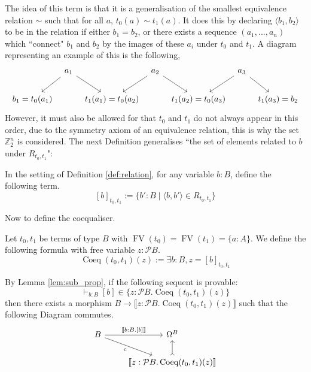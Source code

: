 \documentclass{tac}
\newcommand{\bb}[1]{\mathbb{#1}}
\newcommand{\call}[1]{\mathcal{#1}}
\newcommand{\lto}{\longrightarrow}
\begin{document}
	The idea of this term is that it is a generalisation of the smallest equivalence relation $\sim$ such that for all $a$, $t_0(a) \sim t_1(a)$. It does this by declaring $\langle b_1,b_2\rangle$ to be in the relation if either $b_1 = b_2$, or there exists a sequence $(a_1,...,a_{n})$ which ``connect" $b_1$ and $b_2$ by the images of these $a_i$ under $t_0$ and $t_1$. A diagram representing an example of this is the following,
	\[
	\begin{tikzcd}[column sep = tiny]
		& a_1\arrow[dl]\arrow[dr] & & a_2\arrow[dl]\arrow[dr] & & a_3\arrow[dl]\arrow[dr]\\
		b_1 = t_0(a_1) & & t_1(a_1) = t_0(a_2) & & t_1(a_2) = t_0(a_3) & & t_1(a_3) = b_2
	\end{tikzcd}
	\]
	However, it must also be allowed for that $t_0$ and $t_1$ do not always appear in this order, due to the symmetry axiom of an equivalence relation, this is why the set $\bb{Z}_2^n$ is considered. The next Definition generalises ``the set of elements related to $b$ under $R_{t_0,t_1}$":
	\begin{definition}
		In the setting of Definition \ref{def:relation}, for any variable $b:B$, define the following term.
		\[[b]_{t_0,t_1} := \lbrace b' : B \mid \langle b, b'\rangle \in R_{t_0,t_1} \rbrace\]
	\end{definition}
	Now to define the coequaliser.
	\begin{definition}
		Let $t_0,t_1$ be terms of type $B$ with $\operatorname{FV}(t_0) = \operatorname{FV}(t_1) = \lbrace a: A \rbrace$. We define the following formula with free variable $z : \call{P}B$.
		\begin{equation}\label{eq:coeq_def}
			\operatorname{Coeq}(t_0,t_1)(z) := \exists b: B, z = [b]_{t_0,t_1}
		\end{equation}
	\end{definition}
	By Lemma \ref{lem:sub_prop}, if the following sequent is provable:
	\begin{equation}\label{eq:coeq_sequent}
		\vdash_{b:B}[b] \in \lbrace z: \call{P}B . \operatorname{Coeq}(t_0,t_1)(z)\rbrace
	\end{equation}
	then there exists a morphism $B \lto \llbracket z:\call{P}B . \operatorname{Coeq}(t_0,t_1)(z)\rrbracket$ such that the following Diagram commutes.
	\begin{equation}\label{eq:coeq_existence_commute}
		\begin{tikzcd}
			B\arrow[r,"{\llbracket b:B. [b]\rrbracket}"]\arrow[dr,swap,"{c}"] & \Omega^B\\
			& \llbracket z:\call{P}B. \operatorname{Coeq}(t_0,t_1)(z)\rrbracket\arrow[u,rightarrowtail]
		\end{tikzcd}
	\end{equation}
\end{document}
